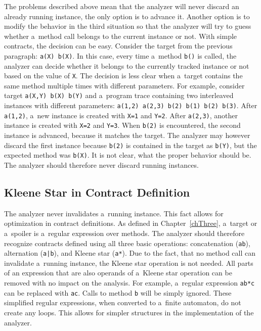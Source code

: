 The problems described above mean that the analyzer will never discard an
already running instance, the only option is to advance it. Another option is to
modify the behavior in the third situation so that the analyzer will try to
guess whether a~method call belongs to the current instance or not. With simple
contracts, the decision can be easy. Consider the target from the previous
paragraph: \texttt{a(X) b(X)}. In this case, every time a~method \texttt{b()} is
called, the analyzer can decide whether it belongs to the currently tracked
instance or not based on the value of \texttt{X}. The decision is less clear
when a~target contains the same method multiple times with different parameters.
For example, consider target \texttt{a(X,Y) b(X) b(Y)} and a~program trace
containing two interleaved instances with different parameters: \texttt{a(1,2)
a(2,3) b(2) b(1) b(2) b(3)}. After \texttt{a(1,2)}, a~new instance is created
with \texttt{X=1} and \texttt{Y=2}. After \texttt{a(2,3)}, another instance is
created with \texttt{X=2} and \texttt{Y=3}. When \texttt{b(2)} is encountered,
the second instance is advanced, because it matches the target. The analyzer may
however discard the first instance because \texttt{b(2)} is contained in the
target as \texttt{b(Y)}, but the expected method was \texttt{b(X)}. It is not
clear, what the proper behavior should be. The analyzer should therefore never
discard running instances.

\subsection{Kleene Star in Contract Definition}
\label{kleene}

The analyzer never invalidates a~running instance. This fact allows for
optimization in contract definitions. As defined in Chapter~\ref{chThree},
a~target or a~spoiler is a~regular expression over methods. The analyzer should
therefore recognize contracts defined using all three basic operations:
concatenation (\texttt{ab}), alternation (\texttt{a|b}), and Kleene star
(\texttt{a*}). Due to the fact, that no method call can invalidate a~running
instance, the Kleene star operation is not needed. All parts of an expression
that are also operands of a~Kleene star operation can be removed with no impact
on the analysis. For example, a~regular expression \texttt{ab*c} can be replaced
with \texttt{ac}. Calls to method \texttt{b} will be simply ignored. These
simplified regular expressions, when converted to a~finite automaton, do not
create any loops. This allows for simpler structures in the implementation of
the analyzer.

